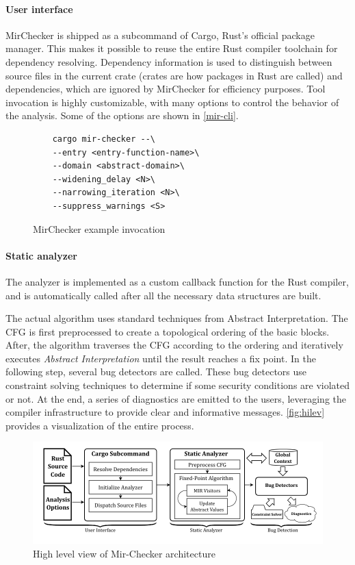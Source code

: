 \documentclass{article}
\begin{document}
\paragraph{User interface} MirChecker is shipped as a subcommand of  
Cargo, Rust's official package manager. This makes it possible to reuse the entire
Rust compiler toolchain for dependency resolving. Dependency information is used 
to distinguish between source files in the current crate (crates are how packages in Rust are called) and dependencies, which are ignored 
by MirChecker for efficiency purposes. Tool invocation is highly customizable, with many options 
to control the behavior of the analysis. Some of the options are shown in \autoref{mir-cli}.
\begin{figure}[H]
\begin{verbatim}
    cargo mir-checker --\ 
    --entry <entry-function-name>\
    --domain <abstract-domain>\ 
    --widening_delay <N>\
    --narrowing_iteration <N>\ 
    --suppress_warnings <S>
\end{verbatim}
    \caption{MirChecker example invocation}
    \label{mir-cli}

\end{figure}


\paragraph{Static analyzer}
The analyzer is implemented as a custom callback function for the Rust compiler, and is 
automatically called after all the necessary data structures are built. 

The actual algorithm uses standard techniques from Abstract Interpretation.
The CFG is first preprocessed to create a topological ordering of the basic blocks. After, the algorithm traverses the CFG according to the ordering 
and iteratively executes \textit{Abstract Interpretation} until the result reaches a fix point.
In the following step, several bug detectors are called. These bug detectors use 
constraint solving techniques to determine if some security conditions are violated or not. At the end, a series of 
diagnostics are emitted to the users, leveraging the compiler infrastructure to provide clear and informative messages.
\autoref{fig:hilev} provides a visualization of the entire process.
\begin{figure}[H]
    \includegraphics[scale=0.5]{hilev.png}
    \caption{High level view of Mir-Checker architecture}
    \label{fig:hilev}
\end{figure}
\end{document}
